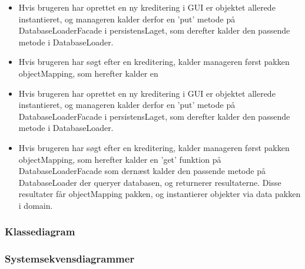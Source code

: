 \begin{itemize}
    \item Hvis brugeren har oprettet en ny kreditering i GUI er objektet
        allerede instantieret, og manageren kalder derfor en 'put' metode på
        DatabaseLoaderFacade i persistensLaget, som derefter kalder den passende
        metode i DatabaseLoader.  
    \item Hvis brugeren har søgt efter en
        kreditering, kalder manageren først pakken objectMapping, som herefter
        kalder en
    \item Hvis brugeren har oprettet en ny kreditering i GUI er objektet allerede instantieret, og manageren kalder derfor en 'put' metode på DatabaseLoaderFacade i persistensLaget, som derefter kalder den passende metode i DatabaseLoader. 
    \item Hvis brugeren har søgt efter en kreditering, kalder manageren først pakken objectMapping, som herefter kalder en 'get' funktion på DatabaseLoaderFacade som dernæst kalder den passende metode på DatabaseLoader der queryer databasen, og returnerer resultaterne. Disse resultater får objectMapping pakken, og instantierer objekter via data pakken i domain.
\end{itemize}



\subsubsection{Klassediagram}%
\label{ssub:klassediagram}


\subsubsection{Systemsekvensdiagrammer}%
\label{ssub:systemsekvensdiagrammer}

